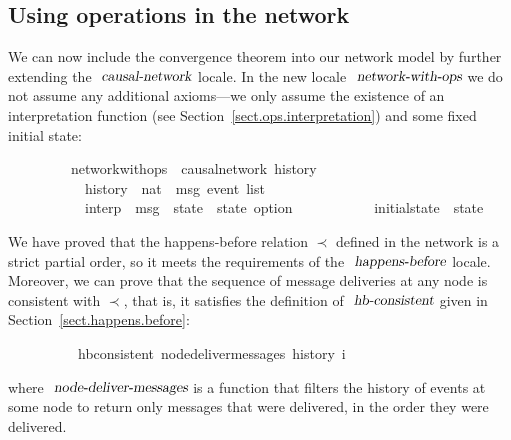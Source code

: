\subsection{Using operations in the network}\label{sect.network.ops}

We can now include the convergence theorem into our network model by further extending the $\isa{causal-network}$ locale.
In the new locale $\isa{network-with-ops}$ we do not assume any additional axioms---we only assume the existence of an interpretation function (see Section~\ref{sect.ops.interpretation}) and some fixed initial state:
\vspace{0.35em}
\begin{isabellebody}
\ \ \ \ \ \ \ \ \ network{\isacharunderscore}with{\isacharunderscore}ops\ {\isacharequal}\ causal{\isacharunderscore}network\ history\isanewline
\ \ \ \ \ \ \ \ \ \ \ history\ {\isacharcolon}{\isacharcolon}\ {\isachardoublequoteopen}nat\ {\isasymRightarrow}\ {\isacharprime}msg\ event\ list{\isachardoublequoteclose}\ {\isacharplus}\isanewline
\ \ \ \ \ \ \ \ \ \ \ interp\ {\isacharcolon}{\isacharcolon}\ {\isachardoublequoteopen}{\isacharprime}msg\ {\isasymRightarrow}\ {\isacharprime}state\ {\isasymRightarrow}\ {\isacharprime}state\ option{\isachardoublequoteclose}\isanewline
\ \ \ \ \ \ \ \ \ \ \ initial{\isacharunderscore}state\ {\isacharcolon}{\isacharcolon}\ {\isachardoublequoteopen}{\isacharprime}state{\isachardoublequoteclose}
\end{isabellebody}
\vspace{0.35em}
We have proved that the happens-before relation $\prec$ defined in the network is a strict partial order, so it meets the requirements of the $\isa{happens-before}$ locale.
Moreover, we can prove that the sequence of message deliveries at any node is consistent with $\prec$, that is, it satisfies the definition of $\isa{hb-consistent}$ given in Section~\ref{sect.happens.before}:
\vspace{0.35em}
\begin{isabellebody}
\ \ \ \ \ \ \ \ \ \ {\isachardoublequoteopen}hb{\isacharunderscore}consistent\ {\isacharparenleft}node{\isacharunderscore}deliver{\isacharunderscore}messages\ {\isacharparenleft}history\ i{\isacharparenright}{\isacharparenright}{\isachardoublequoteclose}
\end{isabellebody}
\vspace{0.35em}
\noindent
where $\isa{node-deliver-messages}$ is a function that filters the history of events at some node to return only messages that were delivered, in the order they were delivered.

